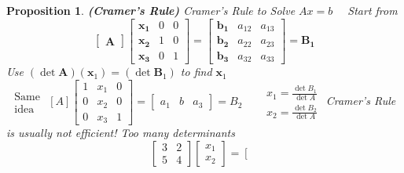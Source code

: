 \documentclass[14pt]{article}
\newtheorem{proposition}[theorem]{Proposition}
\theoremstyle{definition}
\theoremstyle{remark}
\begin{document}
\begin{proposition}
    \textbf{(Cramer's Rule)} Cramer's Rule to Solve $A x=b \quad$ Start from
    $$
        \left[\begin{array}{ll}
                \boldsymbol{A}
            \end{array}\right]\left[\begin{array}{lll}
                \boldsymbol{x}_{\mathbf{1}} & 0 & 0 \\
                \boldsymbol{x}_{\mathbf{2}} & 1 & 0 \\
                \boldsymbol{x}_{\mathbf{3}} & 0 & 1
            \end{array}\right]=\left[\begin{array}{lll}
                \boldsymbol{b}_{\mathbf{1}} & a_{12} & a_{13} \\
                \boldsymbol{b}_{\mathbf{2}} & a_{22} & a_{23} \\
                \boldsymbol{b}_{\mathbf{3}} & a_{32} & a_{33}
            \end{array}\right]=\boldsymbol{B}_{\mathbf{1}}
    $$
    Use $(\det \boldsymbol{A})\left(\boldsymbol{x}_1\right)=\left(\det \boldsymbol{B}_1\right)$ to find $\boldsymbol{x}_1$
    $\begin{array}{ll}\text { Same } \\ \text { idea }\end{array}[A]\left[\begin{array}{lll}1 & x_1 & 0 \\ 0 & x_2 & 0 \\ 0 & x_3 & 1\end{array}\right]=\left[\begin{array}{lll}a_1 & b & a_3\end{array}\right]=B_2 \quad \begin{aligned} & x_1=\frac{\det B_1}{\det A} \\ & x_2=\frac{\det B_2}{\det A}\end{aligned}$
    Cramer's Rule is usually not efficient! Too many determinants
    $$
        \left[\begin{array}{ll}
                3 & 2 \\
                5 & 4
            \end{array}\right]\left[\begin{array}{l}
                x_1 \\
                x_2
            \end{array}\right]=\left[\begin{array}{l}

\end{array}$$
\end{proposition}
\end{document}
